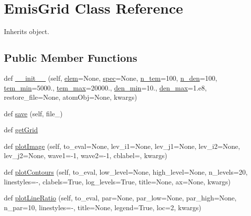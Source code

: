 \hypertarget{classpyneb_1_1core_1_1emis_grid_1_1_emis_grid}{}\section{Emis\+Grid Class Reference}
\label{classpyneb_1_1core_1_1emis_grid_1_1_emis_grid}


Inherits object.

\subsection*{Public Member Functions}
\begin{DoxyCompactItemize}
\item 
def \hyperlink{classpyneb_1_1core_1_1emis_grid_1_1_emis_grid_aae5b18f3f3cbd6bfae7baee194f78fd7}{\+\_\+\+\_\+init\+\_\+\+\_\+} (self, \hyperlink{classpyneb_1_1core_1_1emis_grid_1_1_emis_grid_a62e73dc66c7aff7941c5ce94e808c23a}{elem}=None, \hyperlink{classpyneb_1_1core_1_1emis_grid_1_1_emis_grid_adaf1b66faf18504ec4b5c8c0b7f6763b}{spec}=None, \hyperlink{classpyneb_1_1core_1_1emis_grid_1_1_emis_grid_ae002bbafb87b9a539d7502b3bd653b5a}{n\+\_\+tem}=100, \hyperlink{classpyneb_1_1core_1_1emis_grid_1_1_emis_grid_a9803b616bea9e70db8a134d82578fb92}{n\+\_\+den}=100, \hyperlink{classpyneb_1_1core_1_1emis_grid_1_1_emis_grid_a7979549265e700a5154d388578b9a39a}{tem\+\_\+min}=5000., \hyperlink{classpyneb_1_1core_1_1emis_grid_1_1_emis_grid_a2344326ea27b908e52af4da4782fff4c}{tem\+\_\+max}=20000., \hyperlink{classpyneb_1_1core_1_1emis_grid_1_1_emis_grid_ac8c98f57058ae32b22444c3ef24fcf7b}{den\+\_\+min}=10., \hyperlink{classpyneb_1_1core_1_1emis_grid_1_1_emis_grid_abf1e76d4a681a0edfc86e6b3e2db0096}{den\+\_\+max}=1.e8, restore\+\_\+file=None, atom\+Obj=None, kwargs)
\item 
def \hyperlink{classpyneb_1_1core_1_1emis_grid_1_1_emis_grid_a49b28e510fb82fdba131737d2145eb62}{save} (self, file\+\_\+)
\item 
def \hyperlink{classpyneb_1_1core_1_1emis_grid_1_1_emis_grid_abf8bcfd00d269e5ac521beddcf24b058}{get\+Grid}
\item 
def \hyperlink{classpyneb_1_1core_1_1emis_grid_1_1_emis_grid_a9b4a985f4049065a7371c38bdb88bc2b}{plot\+Image} (self, to\+\_\+eval=None, lev\+\_\+i1=None, lev\+\_\+j1=None, lev\+\_\+i2=None, lev\+\_\+j2=None, wave1=-\/1, wave2=-\/1, cblabel=\textquotesingle{}\textquotesingle{}, kwargs)
\item 
def \hyperlink{classpyneb_1_1core_1_1emis_grid_1_1_emis_grid_ac1824febedfc6a63b69fc7ce61cee2c6}{plot\+Contours} (self, to\+\_\+eval, low\+\_\+level=None, high\+\_\+level=None, n\+\_\+levels=20, linestyles=\textquotesingle{}-\/\textquotesingle{}, clabels=True, log\+\_\+levels=True, title=None, ax=None, kwargs)
\item 
def \hyperlink{classpyneb_1_1core_1_1emis_grid_1_1_emis_grid_ad391c4ef30210ad3c64d5804ff6ed705}{plot\+Line\+Ratio} (self, to\+\_\+eval, par=None, par\+\_\+low=None, par\+\_\+high=None, n\+\_\+par=10, linestyles=\textquotesingle{}-\/\textquotesingle{}, title=None, legend=True, loc=2, kwargs)
\end{DoxyCompactItemize}

